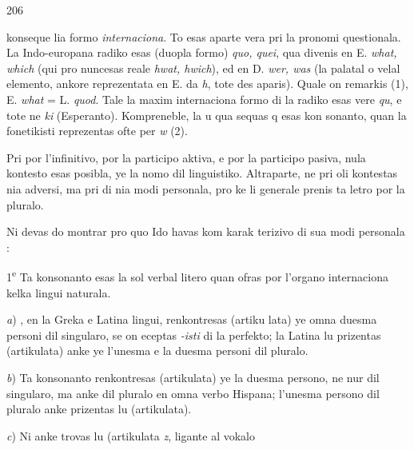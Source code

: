 \begin{VUpage}[210]{206}
\VUornement[7.87mm]{60.62mm}

\VUcontinue
konseque lia formo \textit{internaciona}. To esas aparte vera pri la\nl
pronomi questionala. La Indo-europana radiko esas (duopla\nl
formo) \textit{quo, quei}, qua divenis en E. \textit{what, which} (qui pro\cc
nuncesas reale \textit{hwat, hwich}), ed en D. \textit{wer, was} (la palatal\nl
o velal elemento, ankore reprezentata en E. da \textit{h}, tote des\cc
aparis). Quale on remarkis (1), E. \textit{what} = L. \textit{quod}. Tale la\nl
maxim internaciona formo di la radiko esas vere \textit{qu}, e tote\nl
ne \textit{ki} (Esperanto). Kompreneble, la u qua sequas q esas kon\cc
sonanto, quan la fonetikisti reprezentas ofte per \textit{w} (2).

\VUsaut{13.30mm}
\VUsaut{2.94mm}
\VUsaut{4.95mm}

Pri  por l'infinitivo,  por la participo aktiva, e  por\nl
la participo pasiva, nula kontesto esas posibla, ye la nomo\nl
dil linguistiko. Altraparte, ne pri oli kontestas nia adversi,\nl
ma pri  di nia modi personala, pro ke li generale prenis\nl
ta letro por la pluralo.

Ni devas do montrar pro quo Ido havas  kom karak\cc
terizivo di sua modi personala :

\VUblanc{0.92mm}
1\textsuperscript{e} Ta konsonanto esas la sol verbal litero quan ofras por\nl
l'organo internaciona kelka lingui naturala.

\textit{a}) , en la Greka e Latina lingui, renkontresas (artiku\cc
lata) ye omna duesma personi dil singularo, se on eceptas\nl
\textit{-isti} di la perfekto; la Latina lu prizentas (artikulata) anke\nl
ye l'unesma e la duesma personi dil pluralo.

\textit{b}) Ta konsonanto renkontresas (artikulata) ye la duesma\nl
persono, ne nur dil singularo, ma anke dil pluralo en omna\nl
verbo Hispana; l'unesma persono dil pluralo anke prizentas\nl
lu (artikulata).

\textit{c}) Ni anke trovas lu (artikulata \textit{z}, ligante al vokalo\nl
\end{VUpage}

